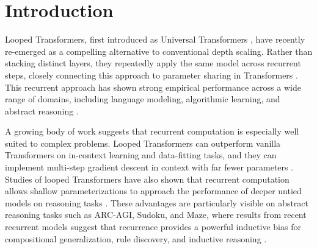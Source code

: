 \section{Introduction}
\label{sec:intro}

Looped Transformers, first introduced as Universal Transformers \citep{dehghani2018universal}, have recently re-emerged as a compelling alternative to conventional depth scaling. Rather than stacking distinct layers, they repeatedly apply the same model across recurrent steps, closely connecting this approach to parameter sharing in Transformers \citep{lan2019albert,dehghani2018universal}. This recurrent approach has shown strong empirical performance across a wide range of domains, including language modeling, algorithmic learning, and abstract reasoning \citep{gao2025universal,yang2023looped,jolicoeurmartineau2025trm,wang2025hierarchical,dehghani2018universal,saunshi2025latentthoughts,bay2025mixture,geiping2025scalinglatent,zhu2025scalinglatent,frey2026adaptive,huang2026equilibrium}.

A growing body of work suggests that recurrent computation is especially well suited to complex problems. Looped Transformers can outperform vanilla Transformers on in-context learning and data-fitting tasks, and they can implement multi-step gradient descent in context with far fewer parameters \citep{yang2023looped,fan2024looped,giannou2023looped,gatmiry2024can,gatmiry2024role,chen2025bypassing}. Studies of looped Transformers have also shown that recurrent computation allows shallow parameterizations to approach the performance of deeper untied models on reasoning tasks \citep{saunshi2025latentthoughts,jeddi2026loopformer,geiping2025scalinglatent,zhu2025scalinglatent}. These advantages are particularly visible on abstract reasoning tasks such as ARC-AGI, Sudoku, and Maze, where results from recent recurrent models suggest that recurrence provides a powerful inductive bias for compositional generalization, rule discovery, and inductive reasoning \citep{wang2025hierarchical,jolicoeurmartineau2025trm,gao2025universal}.

